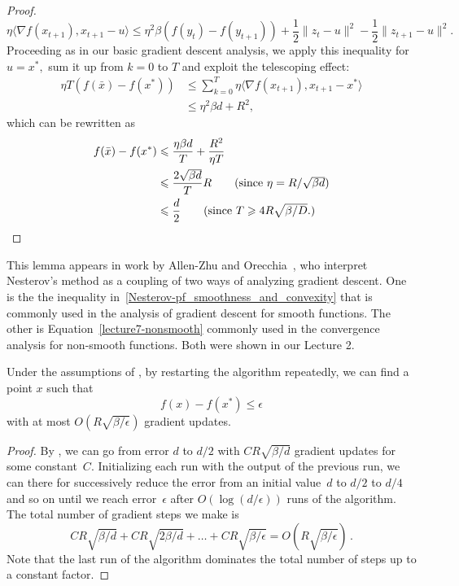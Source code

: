 \begin{proof}
\begin{equation*}
\eta\langle\nabla f(x_{t+1}), x_{t+1} - u\rangle \leq \eta^2 \beta
(f(y_t) - f(y_{t+1})) + \frac12\|z_t - u\|^2 - \frac12\|z_{t+1} - u\|^2.
\end{equation*}
Proceeding as in our basic gradient descent analysis, we apply this inequality
for $u=x^*,$ sum it up from $k=0$ to $T$ and exploit the telescoping effect:
\begin{align*}
\eta T (f(\bar{x}) - f(x^*)) 
&\leq \sum_{k=0}^T \eta \langle\nabla f(x_{t+1}), x_{t+1} - x^*\rangle\\
&\leq \eta^2 \beta d + R^2,
\end{align*}
which can be rewritten as
\begin{align*}
f(\bar{x}) - f(x^*) 
&\leq \frac{\eta\beta d}{T} + \frac{R^2}{\eta T} \\
&\leq \frac{2\sqrt{\beta d}}{T} R \tag{since $\eta=R/\sqrt{\beta d}$} \\
&\leq \frac{d}{2} \tag{since $T\ge 4R\sqrt{\beta/D}.$}
\end{align*}
\end{proof}

This lemma appears in work by Allen-Zhu and Orecchia~\cite{allen2014linear}, who
interpret Nesterov's method as a coupling of two ways of analyzing gradient
descent. One is the the inequality
in~\eqref{Nesterov-pf_smoothness_and_convexity} that is commonly used in the
analysis of gradient descent for smooth functions. The other is
Equation~\ref{lecture7-nonsmooth} commonly used in the convergence analysis for
non-smooth functions. Both were shown in our Lecture 2.

\begin{theorem}
Under the assumptions of , by restarting the algorithm
repeatedly, we can find a point $x$ such that
\[
f(x)-f(x^*)\le\epsilon
\]
with at most $O(R\sqrt{\beta/\epsilon})$ gradient updates.
\end{theorem}
\begin{proof}
By , we can go from error $d$ to $d/2$ with
$CR\sqrt{\beta/d}$ gradient updates for some constant~$C$. 
Initializing each run with the output of
the previous run, we can there for successively reduce the error from an initial
value~$d$ to $d/2$ to $d/4$ and so on until we reach error~$\epsilon$ after
$O(\log(d/\epsilon))$ runs of the algorithm. The total number of gradient steps
we make is
\[
CR\sqrt{\beta/d} 
+CR\sqrt{2\beta/d}
+\dots+CR\sqrt{\beta/\epsilon}
= O\left(R\sqrt{\beta/\epsilon}\right)\,.
\]
Note that the last run of the algorithm dominates the total number of steps up to a
constant factor.
\end{proof}

